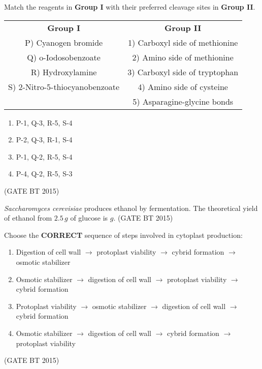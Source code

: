 \item Match the reagents in \textbf{Group I} with their preferred cleavage sites in \textbf{Group II}.  

\begin{table}[H]
\begin{tabular}{cc}
\textbf{Group I} & \textbf{Group II} \\
P) Cyanogen bromide                & 1) Carboxyl side of methionine \\
Q) o-Iodosobenzoate                & 2) Amino side of methionine \\
R) Hydroxylamine                   & 3) Carboxyl side of tryptophan \\
S) 2-Nitro-5-thiocyanobenzoate     & 4) Amino side of cysteine \\
                                   & 5) Asparagine-glycine bonds \\
\end{tabular}
\end{table}
\begin{multicols}{2}
\begin{enumerate}
    \item P-1, Q-3, R-5, S-4
    \item P-2, Q-3, R-1, S-4
    \item P-1, Q-2, R-5, S-4
    \item P-4, Q-2, R-5, S-3
\end{enumerate}
\end{multicols}\hfill (GATE BT 2015)




\item\textit{Saccharomyces cerevisiae} produces ethanol by fermentation. The theoretical yield of ethanol from $2.5 \, g$ of glucose is \underline{\hspace{2cm}} $g$.
\hfill (GATE BT 2015)




\item Choose the \textbf{CORRECT} sequence of steps involved in cytoplast production:

\begin{enumerate}
    \item Digestion of cell wall $\rightarrow$ protoplast viability $\rightarrow$ cybrid formation $\rightarrow$ osmotic stabilizer \\
    \item Osmotic stabilizer $\rightarrow$ digestion of cell wall $\rightarrow$ protoplast viability $\rightarrow$ cybrid formation \\
    \item Protoplast viability $\rightarrow$ osmotic stabilizer $\rightarrow$ digestion of cell wall $\rightarrow$ cybrid formation \\
    \item Osmotic stabilizer $\rightarrow$ digestion of cell wall $\rightarrow$ cybrid formation $\rightarrow$ protoplast viability \\
\end{enumerate} 
\hfill (GATE BT 2015)

